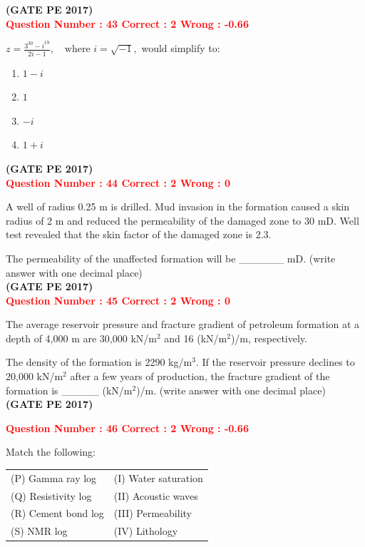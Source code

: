 \documentclass[journal,12pt,onecolumn]{article}
\begin{document}
{\hfill\textbf{(GATE PE 2017)}\\[0.6cm]

\textcolor{red}{\textbf{Question Number : 43 \hfill Correct : 2  Wrong : -0.66}}

{\LARGE$
z = \frac{3^{30} - i^{19}}{2i - 1}, \quad \text{where } i = \sqrt{-1},
$ }
would simplify to:

\begin{enumerate}[label=(\Alph*)]
    \item $1 - i$
    \item $1$
    \item $-i$
    \item $1 + i$
\end{enumerate}
\hfill\textbf{(GATE PE 2017)}\\[0.6cm]

\textcolor{red}{\textbf{Question Number : 44 \hfill Correct : 2  Wrong : 0}}

A well of radius 0.25 m is drilled. Mud invasion in the formation caused a skin radius of 2 m and reduced the permeability of the damaged zone to 30 mD. Well test revealed that the skin factor of the damaged zone is 2.3.

The permeability of the unaffected formation will be \_\_\_\_\_\_ mD. (write answer with one decimal place)\\

\hfill\textbf{(GATE PE 2017)}\\[0.6cm]

\textcolor{red}{\textbf{Question Number : 45 \hfill Correct : 2  Wrong : 0}}

The average reservoir pressure and fracture gradient of petroleum formation at a depth of 4,000 m are 30,000 kN/m$^2$ and 16 (kN/m$^2$)/m, respectively.

The density of the formation is 2290 kg/m$^3$. If the reservoir pressure declines to 20,000 kN/m$^2$ after a few years of production, the fracture gradient of the formation is \_\_\_\_\_ (kN/m$^2$)/m. (write answer with one decimal place)\\

\hfill\textbf{(GATE PE 2017)}\\[0.6cm]

\newpage

\textcolor{red}{\textbf{Question Number : 46 \hfill Correct : 2  Wrong : -0.66}}

Match the following:

\begin{tabular}{ll}
(P) Gamma ray log & (I) Water saturation \\
(Q) Resistivity log & (II) Acoustic waves \\
(R) Cement bond log & (III) Permeability \\
(S) NMR log & (IV) Lithology \\
\end{tabular}

}
\end{document}
